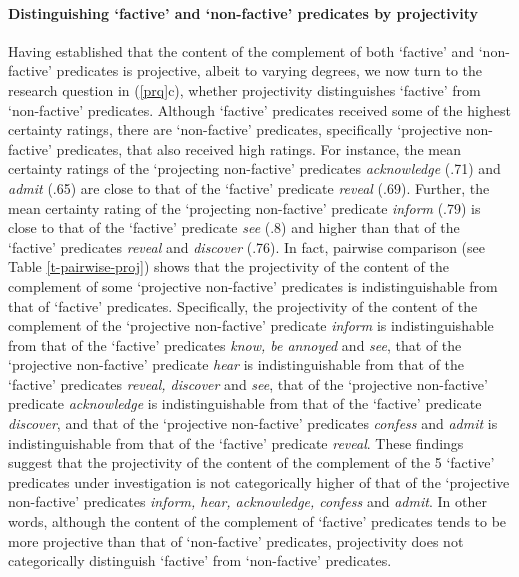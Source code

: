 \documentclass[11pt,fleqn]{article}
\newcommand{\6}{\mbox{$[\hspace*{-.6mm}[$}}
\newcommand{\9}{\mbox{$]\hspace*{-.6mm}]$}}
\begin{document}
\paragraph{Distinguishing `factive' and `non-factive' predicates by projectivity} Having established that the content of the complement of both `factive' and `non-factive' predicates is projective, albeit to varying degrees, we now turn to the research question in (\ref{prq}c), whether projectivity distinguishes `factive' from `non-factive' predicates. Although `factive' predicates received some of the highest certainty ratings, there are `non-factive' predicates, specifically `projective non-factive' predicates, that also received high ratings. For instance, the mean certainty ratings of the `projecting non-factive' predicates {\em acknowledge} (.71) and {\em admit} (.65) are close to that of the `factive' predicate {\em reveal} (.69). Further, the mean certainty rating of the `projecting non-factive' predicate {\em inform} (.79) is close to that of the `factive' predicate {\em see} (.8) and higher than that of the `factive' predicates {\em reveal} and  {\em discover} (.76).  In fact, pairwise comparison (see Table \ref{t-pairwise-proj}) shows that the projectivity of the content of the complement of some `projective non-factive' predicates is indistinguishable from that of `factive' predicates. Specifically, the projectivity of the content of the complement of the `projective non-factive' predicate {\em inform} is indistinguishable from that of the `factive' predicates {\em know, be annoyed} and {\em see}, that of the `projective non-factive' predicate {\em hear} is indistinguishable from that of the `factive' predicates {\em reveal, discover} and {\em see}, that of the `projective non-factive' predicate {\em acknowledge} is indistinguishable from that of the `factive' predicate {\em discover}, and that of the `projective non-factive' predicates {\em confess} and {\em admit} is indistinguishable from that of the `factive' predicate {\em reveal}. These findings suggest that the projectivity of the content of the complement of the 5 `factive' predicates under investigation is not categorically higher of that of the `projective non-factive' predicates {\em inform, hear, acknowledge, confess} and {\em admit}. In other words, although the content of the complement of `factive' predicates tends to be more projective than that of `non-factive' predicates, projectivity does not categorically distinguish `factive' from `non-factive' predicates.
\end{document}
